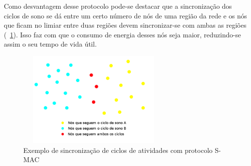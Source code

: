 Como desvantagem desse protocolo pode-se destacar que a sincronização dos ciclos de sono se dá entre um certo número de nós de uma região da rede e os nós que ficam no limiar entre duas regiões devem sincronizar-se com ambas as regiões (~\ref{fig:SmacSynch}). Isso faz com que o consumo de energia desses nós seja maior, reduzindo-se assim o seu tempo de vida útil.

\begin{figure}[!htb]
\centering
\includegraphics[width=290px,height=180px]{./Pictures/S-MACSynchronization.png}
\caption{Exemplo de sincronização de ciclos de atividades com protocolo S-MAC} %
\label{fig:SmacSynch} %
\end{figure}
 
 



% 

